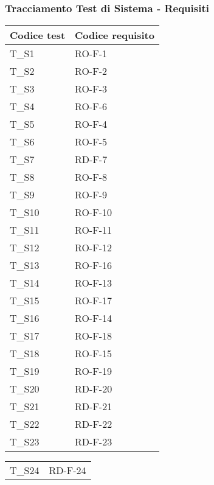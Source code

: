 \subsubsection{Tracciamento Test di Sistema - Requisiti}
\begin{center}
    \renewcommand{\arraystretch}{1.8}
    \begin{tabular}{|m{6em}|m{8em}|}
        \hline
        \textbf{Codice test} & \textbf{Codice requisito}\\
        \hline
        T\_S1 & RO-F-1\\
        \hline
        T\_S2 & RO-F-2\\
        \hline
        T\_S3 & RO-F-3\\
        \hline
        T\_S4 & RO-F-6\\
        \hline
        T\_S5 & RO-F-4\\
        \hline
        T\_S6 & RO-F-5\\
        \hline
        T\_S7 & RD-F-7\\
        \hline
        T\_S8 & RO-F-8\\
        \hline
        T\_S9 & RO-F-9\\
        \hline
        T\_S10 & RO-F-10\\
        \hline
        T\_S11 & RO-F-11\\
        \hline
        T\_S12 & RO-F-12\\
        \hline
        T\_S13 & RO-F-16\\
        \hline
        T\_S14 & RO-F-13\\
        \hline
        T\_S15 & RO-F-17\\
        \hline
        T\_S16 & RO-F-14\\
        \hline
        T\_S17 & RO-F-18\\
        \hline
        T\_S18 & RO-F-15\\
        \hline
        T\_S19 & RO-F-19\\
        \hline
        T\_S20 & RD-F-20\\
        \hline
        T\_S21 & RD-F-21\\
        \hline
        T\_S22 & RD-F-22\\
        \hline
        T\_S23 & RD-F-23\\
        \hline
    \end{tabular}
    \newpage
    \renewcommand{\arraystretch}{1.8}
    \begin{tabular}{|m{6em}|m{8em}|}
        \hline
        T\_S24 & RD-F-24\\

\end{tabular}
\end{center}
